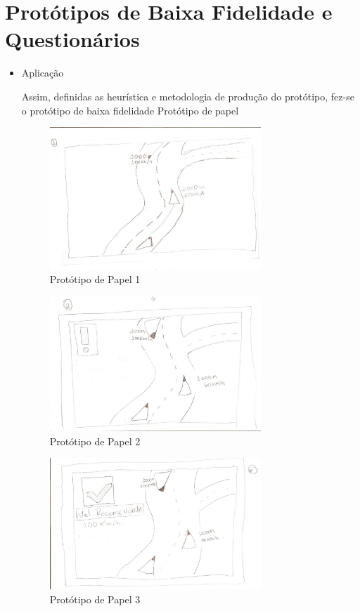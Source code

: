 \chapter{Protótipos de Baixa Fidelidade e Questionários}

\begin{itemize}

\item {Aplicação}

Assim, definidas as heurística e metodologia de produção do protótipo, fez-se o protótipo de baixa fidelidade
Protótipo de papel

\begin{figure}[h]
  \centering
  \includegraphics[width=300px, scale=1]{figuras/prototipo1}
  \caption{Protótipo de Papel 1}
\label{fig:prototipo1}
\end{figure}

\begin{figure}[h]
  \centering
  \includegraphics[width=300px, scale=1]{figuras/prototipo2}
  \caption{Protótipo de Papel 2}
\label{fig:prototipo2}
\end{figure}

\begin{figure}[h]
  \centering
  \includegraphics[width=300px, scale=1]{figuras/prototipo3}
  \caption{Protótipo de Papel 3}
\label{fig:prototipo3}
\end{figure}


\end{itemize}
